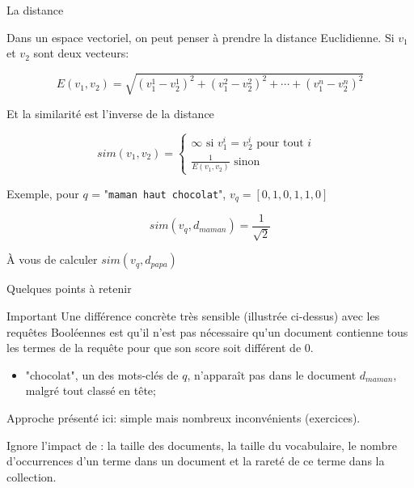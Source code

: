 \begin{frame}{La distance}

Dans un espace vectoriel, on peut penser à prendre la \alert{distance Euclidienne}. Si
$v_1$ et  $v_2$  sont deux vecteurs:

   $$E(v_1, v_2) = \sqrt{(v_1^1 - v^1_2)^2 + (v^2_1 - v^2_2)^2 + \cdots + (v_1^n - v^n_2)^2}$$

\vfill

Et la similarité est l'inverse de la distance

\[
      sim(v_1, v_2) = \left\{
                \begin{array}{ll}
                  \infty \text{ si $v^i_1=v^i_2$ pour tout $i$ }\\
                  \frac{1}{E(v_1, v_2)}  \text{ sinon}
                \end{array}
              \right.
\]

\vfill

Exemple, pour $q$ = "\texttt{maman haut chocolat}", $v_q = [0, 1, 0, 1, 1, 0]$

  $$sim (v_q, d_{maman}) = \frac{1}{\sqrt{2}}$$
  
\begin{exoblock}
À vous de calculer  $sim (v_q, d_{papa})$
\end{exoblock}
\end{frame}

\begin{frame}{Quelques points à retenir}

\begin{block}{Important}
Une différence concrète très sensible (illustrée ci-dessus) avec 
les requêtes Booléennes est qu’il n’est pas nécessaire qu’un document contienne tous les termes de la requête pour que son score soit différent de 0.
\end{block}

\begin{itemize}
   \item   "chocolat", un des mots-clés de $q$, 
   n’apparaît pas dans le document $d_{maman}$, malgré tout classé en tête;
\end{itemize}

\vfill

Approche présenté ici: simple mais \alert{nombreux inconvénients} (exercices).  

\vfill

Ignore l'impact de :  la taille des documents,
la taille du vocabulaire, le nombre d'occurrences d'un terme dans un document
et la rareté de ce terme dans la collection.

\end{frame}
